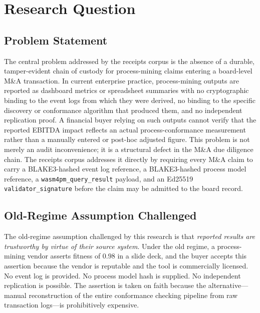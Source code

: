 \section{Research Question}
\label{sec:receipts-question}

\subsection{Problem Statement}
\label{sec:receipts-question-problem}

The central problem addressed by the receipts corpus is the absence of a durable, tamper-evident
chain of custody for process-mining claims entering a board-level M\&A transaction. In current
enterprise practice, process-mining outputs are reported as dashboard metrics or spreadsheet
summaries with no cryptographic binding to the event logs from which they were derived, no
binding to the specific discovery or conformance algorithm that produced them, and no
independent replication proof. A financial buyer relying on such outputs cannot verify that
the reported EBITDA impact reflects an actual process-conformance measurement rather than a
manually entered or post-hoc adjusted figure. This problem is not merely an audit inconvenience;
it is a structural defect in the M\&A due diligence chain. The receipts corpus addresses it
directly by requiring every M\&A claim to carry a BLAKE3-hashed event log reference, a
BLAKE3-hashed process model reference, a \texttt{wasm4pm\_query\_result} payload, and an
Ed25519 \texttt{validator\_signature} before the claim may be admitted to the board record.

\subsection{Old-Regime Assumption Challenged}
\label{sec:receipts-question-old-regime}

The old-regime assumption challenged by this research is that \emph{reported results are
trustworthy by virtue of their source system}. Under the old regime, a process-mining vendor
asserts fitness of $0.98$ in a slide deck, and the buyer accepts this assertion because the
vendor is reputable and the tool is commercially licensed. No event log is provided. No process
model hash is supplied. No independent replication is possible. The assertion is taken on faith
because the alternative---manual reconstruction of the entire conformance checking pipeline from
raw transaction logs---is prohibitively expensive.


